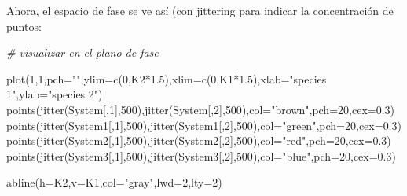 \documentclass[
]{article}
\newenvironment{Shaded}{\begin{snugshade}}{\end{snugshade}}
\newcommand{\AttributeTok}[1]{\textcolor[rgb]{0.77,0.63,0.00}{#1}}
\newcommand{\CommentTok}[1]{\textcolor[rgb]{0.56,0.35,0.01}{\textit{#1}}}
\newcommand{\DecValTok}[1]{\textcolor[rgb]{0.00,0.00,0.81}{#1}}
\newcommand{\FloatTok}[1]{\textcolor[rgb]{0.00,0.00,0.81}{#1}}
\newcommand{\FunctionTok}[1]{\textcolor[rgb]{0.00,0.00,0.00}{#1}}
\newcommand{\NormalTok}[1]{#1}
\newcommand{\SpecialCharTok}[1]{\textcolor[rgb]{0.00,0.00,0.00}{#1}}
\newcommand{\StringTok}[1]{\textcolor[rgb]{0.31,0.60,0.02}{#1}}
\begin{document}
Ahora, el espacio de fase se ve así (con jittering para indicar la
concentración de puntos:

\begin{Shaded}
\begin{Highlighting}[]
\CommentTok{\# visualizar en el plano de fase}

\FunctionTok{plot}\NormalTok{(}\DecValTok{1}\NormalTok{,}\DecValTok{1}\NormalTok{,}\AttributeTok{pch=}\StringTok{""}\NormalTok{,}\AttributeTok{ylim=}\FunctionTok{c}\NormalTok{(}\DecValTok{0}\NormalTok{,K2}\SpecialCharTok{*}\FloatTok{1.5}\NormalTok{),}\AttributeTok{xlim=}\FunctionTok{c}\NormalTok{(}\DecValTok{0}\NormalTok{,K1}\SpecialCharTok{*}\FloatTok{1.5}\NormalTok{),}\AttributeTok{xlab=}\StringTok{"species 1"}\NormalTok{,}\AttributeTok{ylab=}\StringTok{"species 2"}\NormalTok{)}
\FunctionTok{points}\NormalTok{(}\FunctionTok{jitter}\NormalTok{(System[,}\DecValTok{1}\NormalTok{],}\DecValTok{500}\NormalTok{),}\FunctionTok{jitter}\NormalTok{(System[,}\DecValTok{2}\NormalTok{],}\DecValTok{500}\NormalTok{),}\AttributeTok{col=}\StringTok{"brown"}\NormalTok{,}\AttributeTok{pch=}\DecValTok{20}\NormalTok{,}\AttributeTok{cex=}\FloatTok{0.3}\NormalTok{)}
\FunctionTok{points}\NormalTok{(}\FunctionTok{jitter}\NormalTok{(System1[,}\DecValTok{1}\NormalTok{],}\DecValTok{500}\NormalTok{),}\FunctionTok{jitter}\NormalTok{(System1[,}\DecValTok{2}\NormalTok{],}\DecValTok{500}\NormalTok{),}\AttributeTok{col=}\StringTok{"green"}\NormalTok{,}\AttributeTok{pch=}\DecValTok{20}\NormalTok{,}\AttributeTok{cex=}\FloatTok{0.3}\NormalTok{)}
\FunctionTok{points}\NormalTok{(}\FunctionTok{jitter}\NormalTok{(System2[,}\DecValTok{1}\NormalTok{],}\DecValTok{500}\NormalTok{),}\FunctionTok{jitter}\NormalTok{(System2[,}\DecValTok{2}\NormalTok{],}\DecValTok{500}\NormalTok{),}\AttributeTok{col=}\StringTok{"red"}\NormalTok{,}\AttributeTok{pch=}\DecValTok{20}\NormalTok{,}\AttributeTok{cex=}\FloatTok{0.3}\NormalTok{)}
\FunctionTok{points}\NormalTok{(}\FunctionTok{jitter}\NormalTok{(System3[,}\DecValTok{1}\NormalTok{],}\DecValTok{500}\NormalTok{),}\FunctionTok{jitter}\NormalTok{(System3[,}\DecValTok{2}\NormalTok{],}\DecValTok{500}\NormalTok{),}\AttributeTok{col=}\StringTok{"blue"}\NormalTok{,}\AttributeTok{pch=}\DecValTok{20}\NormalTok{,}\AttributeTok{cex=}\FloatTok{0.3}\NormalTok{)}

\FunctionTok{abline}\NormalTok{(}\AttributeTok{h=}\NormalTok{K2,}\AttributeTok{v=}\NormalTok{K1,}\AttributeTok{col=}\StringTok{"gray"}\NormalTok{,}\AttributeTok{lwd=}\DecValTok{2}\NormalTok{,}\AttributeTok{lty=}\DecValTok{2}\NormalTok{)}
\end{Highlighting}
\end{Shaded}
\end{document}
